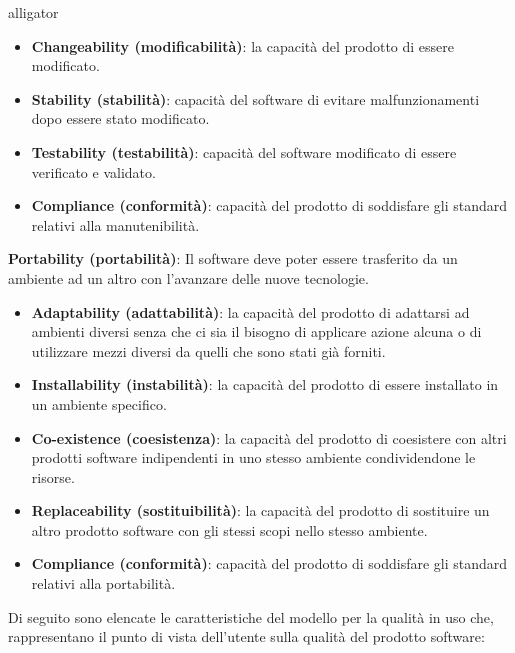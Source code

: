 \begin{labeling}{alligator}
\begin{itemize}
		\item \textbf{Changeability (modificabilità)}: la capacità del prodotto di essere modificato.
		
		\item \textbf{Stability (stabilità)}: capacità del software di evitare malfunzionamenti dopo essere stato modificato.
		
		\item \textbf{Testability (testabilità)}: capacità del software modificato di essere verificato e validato.
		
		\item \textbf{Compliance (conformità)}: capacità del prodotto di soddisfare gli standard relativi alla manutenibilità.
	\end{itemize}
	
	\item \textbf{Portability (portabilità)}: Il software deve poter essere trasferito da un ambiente ad un altro con l'avanzare delle nuove tecnologie.
	\begin{itemize}
		\item \textbf{Adaptability (adattabilità)}: la capacità del prodotto di adattarsi ad ambienti diversi senza che ci sia il bisogno di applicare azione alcuna o di utilizzare mezzi diversi da quelli che sono stati già forniti. 
		
		\item \textbf{Installability (instabilità)}: la capacità del prodotto di essere installato in un ambiente specifico.
		
		\item \textbf{Co-existence (coesistenza)}: la capacità del prodotto di coesistere con altri prodotti software indipendenti in uno stesso ambiente condividendone le risorse.
		
		\item \textbf{Replaceability (sostituibilità)}: la capacità del prodotto di sostituire un altro prodotto software con gli stessi scopi nello stesso ambiente. 
		
		\item \textbf{Compliance (conformità)}: capacità del prodotto di soddisfare gli standard relativi alla portabilità.
	\end{itemize}
\end{labeling}

Di seguito sono elencate le caratteristiche del modello per la qualità in uso che, rappresentano il punto di vista dell'utente sulla qualità del prodotto software:

